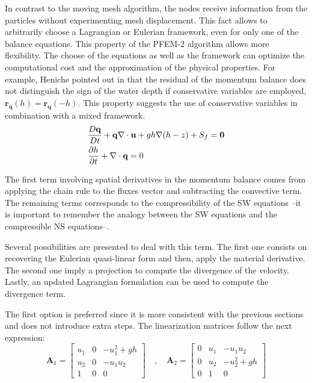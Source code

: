 In contrast to the moving mesh algorithm, the nodes receive information from the particles without experimenting mesh displacement.
This fact allows to arbitrarily choose a Lagrangian or Eulerian framework, even for only one of the balance equations.
This property of the PFEM-2 algorithm allows more flexibility. The choose of the equations as well as the framework can optimize the computational cost and the approximation of the physical properties.
For example, Heniche pointed out in \cite{heniche2000} that the residual of the momentum balance does not distinguish the sign of the water depth if conservative variables are employed, $\mathbf{r}_\mathbf{q}(h) = \mathbf{r}_\mathbf{q}(-h)$.
This property suggests the use of conservative variables in combination with a mixed framework.
\begin{subequations} \label{pfem2_sw_eq}
\begin{align}
    &\frac{D\mathbf{q}}{Dt} + \mathbf{q} \nabla \cdot \mathbf{u} + gh \nabla (h-z) + S_f = \mathbf{0} \\
    &\frac{\partial h}{\partial t} + \nabla \cdot \mathbf{q} = 0
\end{align}
\end{subequations}


The first term involving spatial derivatives in the momentum balance comes from applying the chain rule to the fluxes vector and subtracting the convective term. The remaining terms corresponds to the compressibility of the SW equations --it is important to remember the analogy between the SW equations and the compressible NS equations--.

Several possibilities are presented to deal with this term. The first one consists on recovering the Eulerian quasi-linear form and then, apply the material derivative. The second one imply a projection to compute the divergence of the velocity. Lastly, an updated Lagrangian formulation can be used to compute the divergence term.

The first option is preferred since it is more consistent with the previous sections and does not introduce extra steps. The linearization matrices follow the next expression:
\begin{equation}
    \mathbf{A}_1 = \left[\begin{matrix}
        u_1  & 0   & -u_1^2 + gh \\
        u_2  & 0   & -u_1 u_2 \\
        1    & 0   & 0
    \end{matrix} \right]
    \quad , \quad
    \mathbf{A}_2 = \left[\begin{matrix}
        0   & u_1  & -u_1 u_2 \\
        0   & u_2  & -u_2^2 + gh \\
        0   & 1    & 0
    \end{matrix} \right]
\end{equation}




